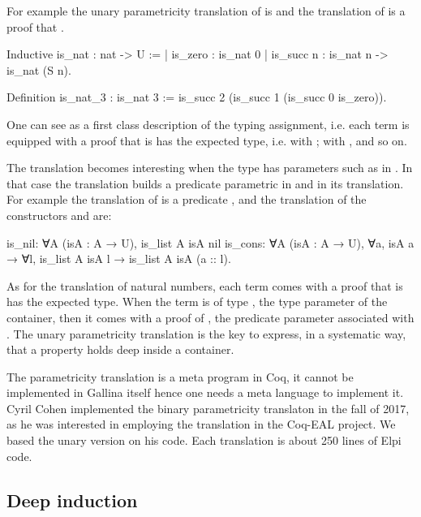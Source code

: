 \documentclass[a4paper, 11pt]{book}
\begin{document}
For example the unary parametricity translation of
 is  and
the translation of  is a proof that .

\begin{coqcode}
Inductive is_nat : nat -> U :=
| is_zero : is_nat 0
| is_succ n : is_nat n -> is_nat (S n).

Definition is_nat_3 : is_nat 3 :=
  is_succ 2 (is_succ 1 (is_succ 0 is_zero)).
\end{coqcode}

One can see  as a first class description of the
typing assignment, i.e. each term is equipped with a proof that
is has the expected type, i.e.  with ;
 with , and so on.

The translation becomes interesting when the type has parameters such as
 in . In that case the translation builds
a predicate parametric in  and in its translation. For example
the translation of  is a predicate
,
and the translation of the constructors  and 
are:
\begin{coqcode}
is_nil: ∀A (isA : A → U), is_list A isA nil
is_cons: ∀A (isA : A → U), ∀a, isA a → 
  ∀l, is_list A isA l → is_list A isA (a :: l).
\end{coqcode}

As for the translation of natural numbers, each term comes with a proof
that is has the expected type. When the term is of type ,
the type parameter of the container, then it comes with a proof of ,
the predicate parameter associated with .
The unary parametricity translation is the key to express, in a
systematic way, that a property holds deep inside a container.

The parametricity translation is a meta program in Coq, it cannot be implemented in
Gallina itself hence one needs a meta language to implement it.
Cyril Cohen implemented the binary parametricity translaton in the fall of 2017,
as he was interested in employing the translation in the Coq-EAL project.
We based the unary version on his code. Each translation is about 250 lines
of Elpi code.

\subsection{Deep induction}
\end{document}
